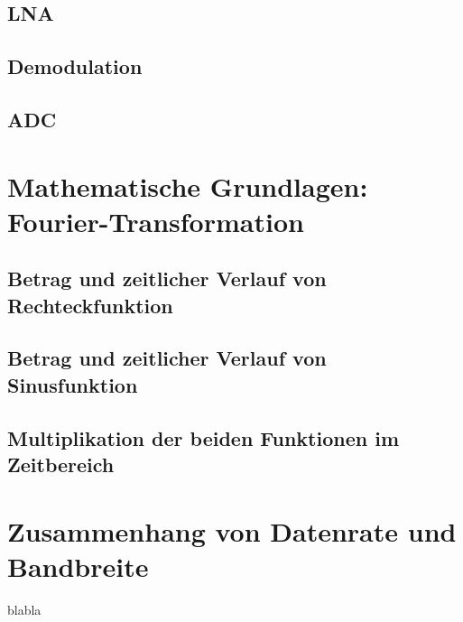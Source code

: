 \subsection{LNA}
\subsection{Demodulation}
\subsection{ADC}
\section{Mathematische Grundlagen: Fourier-Transformation}
\subsection{Betrag und zeitlicher Verlauf von Rechteckfunktion}
\subsection{Betrag und zeitlicher Verlauf von Sinusfunktion}
\subsection{Multiplikation der beiden Funktionen im Zeitbereich}
\section{Zusammenhang von Datenrate und Bandbreite}
blabla
\clearpage